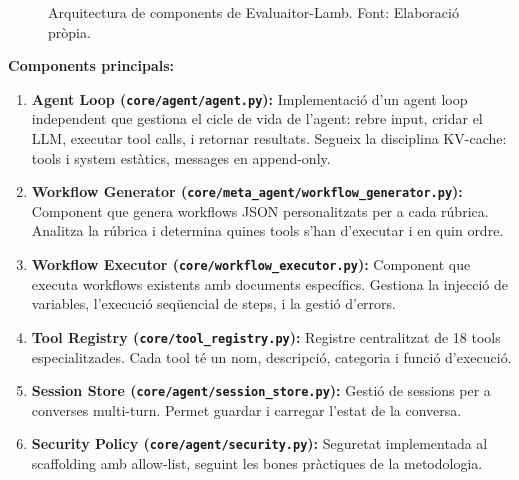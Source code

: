 \documentclass[12pt,a4paper,twoside]{report}
\begin{document}
\begin{figure}[H]
\caption{Arquitectura de components de Evaluaitor-Lamb. Font: Elaboraci\'o pr\`opia.}
\label{fig:arquitectura}
\end{figure}

\textbf{Components principals:}

\begin{enumerate}
    \item \textbf{Agent Loop (\texttt{core/agent/agent.py}):} Implementaci\'o d'un agent loop independent que gestiona el cicle de vida de l'agent: rebre input, cridar el LLM, executar tool calls, i retornar resultats. Segueix la disciplina KV-cache: tools i system est\`atics, messages en append-only.
    \item \textbf{Workflow Generator (\texttt{core/meta\_agent/workflow\_generator.py}):} Component que genera workflows JSON personalitzats per a cada r\'ubrica. Analitza la r\'ubrica i determina quines tools s'han d'executar i en quin ordre.
    \item \textbf{Workflow Executor (\texttt{core/workflow\_executor.py}):} Component que executa workflows existents amb documents espec\'ifics. Gestiona la injecci\'o de variables, l'execuci\'o seq\"uencial de steps, i la gesti\'o d'errors.
    \item \textbf{Tool Registry (\texttt{core/tool\_registry.py}):} Registre centralitzat de 18 tools especialitzades. Cada tool t\'e un nom, descripci\'o, categoria i funci\'o d'execuci\'o.
    \item \textbf{Session Store (\texttt{core/agent/session\_store.py}):} Gesti\'o de sessions per a converses multi-turn. Permet guardar i carregar l'estat de la conversa.
    \item \textbf{Security Policy (\texttt{core/agent/security.py}):} Seguretat implementada al scaffolding amb allow-list, seguint les bones pr\`actiques de la metodologia.
\end{enumerate}
\end{document}
